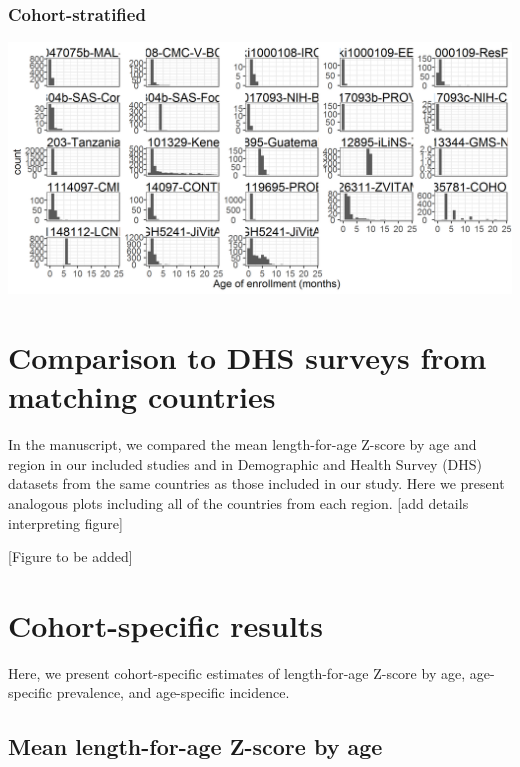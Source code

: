 \documentclass[9pt,]{book}
\begin{document}
\hypertarget{cohort-stratified-1}{%
\subsection{Cohort-stratified}\label{cohort-stratified-1}}

\includegraphics[width=33.33in]{figure-copies/enrollment_age_histogram_over_7d_cohort}

\hypertarget{DHS}{%
\chapter{Comparison to DHS surveys from matching countries}\label{DHS}}

\raggedright

In the manuscript, we compared the mean length-for-age Z-score by age and region in our included studies and in Demographic and Health Survey (DHS) datasets from the same countries as those included in our study. Here we present analogous plots including all of the countries from each region. {[}add details interpreting figure{]}

{[}Figure to be added{]}

\hypertarget{cohort}{%
\chapter{Cohort-specific results}\label{cohort}}

\raggedright

Here, we present cohort-specific estimates of length-for-age Z-score by age, age-specific prevalence, and age-specific incidence.

\hypertarget{mean-length-for-age-z-score-by-age}{%
\section{Mean length-for-age Z-score by age}\label{mean-length-for-age-z-score-by-age}}
\end{document}
